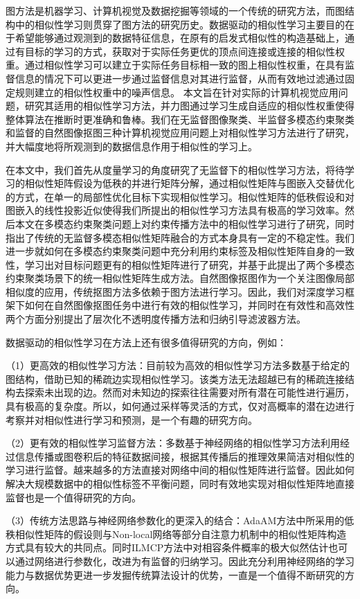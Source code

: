 
\begin{summary}
图方法是机器学习、计算机视觉及数据挖掘等领域的一个传统的研究方法，而图结构中的相似性学习则贯穿了图方法的研究历史。数据驱动的相似性学习主要目的在于希望能够通过观测到的数据特征信息，在原有的启发式相似性的构造基础上，通过有目标的学习的方式，获取对于实际任务更优的顶点间连接或连接的相似性权重。通过相似性学习可以建立于实际任务目标相一致的图上相似性权重，在具有监督信息的情况下可以更进一步通过监督信息对其进行监督，从而有效地过滤通过固定规则建立的相似性权重中的噪声信息。
本文旨在针对实际的计算机视觉应用问题，研究其适用的相似性学习方法，并力图通过学习生成自适应的相似性权重使得整体算法在推断时更准确和鲁棒。我们在无监督图像聚类、半监督多模态约束聚类和监督的自然图像抠图三种计算机视觉应用问题上对相似性学习方法进行了研究，并大幅度地将所观测到的数据信息作用于相似性的学习上。

在本文中，我们首先从度量学习的角度研究了无监督下的相似性学习方法，将待学习的相似性矩阵假设为低秩的并进行矩阵分解，通过相似性矩阵与图嵌入交替优化的方式，在单一的局部性优化目标下实现相似性学习。相似性矩阵的低秩假设和对图嵌入的线性投影近似使得我们所提出的相似性学习方法具有极高的学习效率。然后本文在多模态约束聚类问题上对约束传播方法中的相似性学习进行了研究，同时指出了传统的无监督多模态相似性矩阵融合的方式本身具有一定的不稳定性。我们进一步就如何在多模态约束聚类问题中充分利用约束标签及相似性矩阵自身的一致性，学习出对目标问题更有的相似性矩阵进行了研究，并基于此提出了两个多模态约束聚类场景下的统一相似性矩阵生成方法。自然图像抠图作为一个关注图像局部相似度的应用，传统抠图方法多依赖于图方法进行学习。因此，我们对深度学习框架下如何在自然图像抠图任务中进行有效的相似性学习，并同时在有效性和高效性两个方面分别提出了层次化不透明度传播方法和归纳引导滤波器方法。

数据驱动的相似性学习在方法上还有很多值得研究的方向，例如：

（1）更高效的相似性学习方法：目前较为高效的相似性学习方法多数基于给定的图结构，借助已知的稀疏边实现相似性学习。该类方法无法超越已有的稀疏连接结构去探索未出现的边。然而对未知边的探索往往需要对所有潜在可能性进行遍历，具有极高的复杂度。所以，如何通过采样等灵活的方式，仅对高概率的潜在边进行考察并对相似性进行学习和预测，是一个有趣的研究方向。

（2）更有效的相似性学习监督方法：多数基于神经网络的相似性学习方法利用经过信息传播或图卷积后的特征数据间接，根据其传播后的推理效果简洁对相似性的学习进行监督。越来越多的方法直接对网络中间的相似性矩阵进行监督\cite{yu2020context,wang2020affinity}。因此如何解决大规模数据中的相似性标签不平衡问题，同时有效地实现对相似性矩阵地直接监督也是一个值得研究的方向。

（3）传统方法思路与神经网络参数化的更深入的结合：AdaAM方法中所采用的低秩相似性矩阵的假设则与Non-local网络\cite{wang2018non}等部分自注意力机制中的相似性矩阵构造方式具有较大的共同点。同时ILMCP方法中对相容条件概率的极大似然估计也可以通过网络进行参数化，改进为有监督的归纳学习。因此充分利用神经网络的学习能力与数据优势更进一步发掘传统算法设计的优势，一直是一个值得不断研究的方向。
\end{summary}
